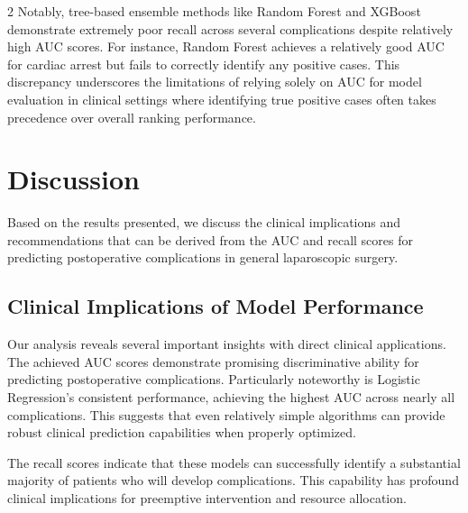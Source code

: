 \documentclass[bst/sn-nature]{sn-jnl}
\begin{document}
\begin{multicols}{2}
Notably, tree-based ensemble methods like Random Forest and XGBoost demonstrate extremely poor recall across several complications despite relatively high AUC scores. For instance, Random Forest achieves a relatively good AUC for cardiac arrest but fails to correctly identify any positive cases. This discrepancy underscores the limitations of relying solely on AUC for model evaluation in clinical settings where identifying true positive cases often takes precedence over overall ranking performance.

\section{Discussion}

\quad Based on the results presented, we discuss the clinical implications and recommendations that can be derived from the AUC and recall scores for predicting postoperative complications in general laparoscopic surgery.


\subsection{Clinical Implications of Model Performance}

\quad Our analysis reveals several important insights with direct clinical applications. The achieved AUC scores demonstrate promising discriminative ability for predicting postoperative complications. Particularly noteworthy is Logistic Regression's consistent performance, achieving the highest AUC across nearly all complications. This suggests that even relatively simple algorithms can provide robust clinical prediction capabilities when properly optimized.

The recall scores indicate that these models can successfully identify a substantial majority of patients who will develop complications. This capability has profound clinical implications for preemptive intervention and resource allocation.



\end{multicols}
\end{document}
